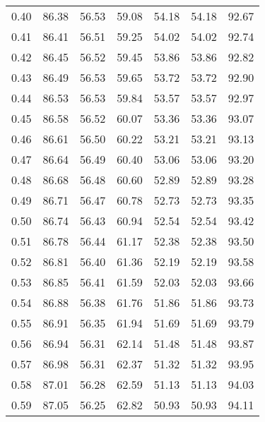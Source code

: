 \begin{tabular}{|c|c|c|c|c|c|c|}
      0.40 &     86.38 &     56.53 &      59.08 &   54.18 &      54.18 &         92.67 \\
      0.41 &     86.41 &     56.51 &      59.25 &   54.02 &      54.02 &         92.74 \\
      0.42 &     86.45 &     56.52 &      59.45 &   53.86 &      53.86 &         92.82 \\
      0.43 &     86.49 &     56.53 &      59.65 &   53.72 &      53.72 &         92.90 \\
      0.44 &     86.53 &     56.53 &      59.84 &   53.57 &      53.57 &         92.97 \\
      0.45 &     86.58 &     56.52 &      60.07 &   53.36 &      53.36 &         93.07 \\
      0.46 &     86.61 &     56.50 &      60.22 &   53.21 &      53.21 &         93.13 \\
      0.47 &     86.64 &     56.49 &      60.40 &   53.06 &      53.06 &         93.20 \\
      0.48 &     86.68 &     56.48 &      60.60 &   52.89 &      52.89 &         93.28 \\
      0.49 &     86.71 &     56.47 &      60.78 &   52.73 &      52.73 &         93.35 \\
      0.50 &     86.74 &     56.43 &      60.94 &   52.54 &      52.54 &         93.42 \\
      0.51 &     86.78 &     56.44 &      61.17 &   52.38 &      52.38 &         93.50 \\
      0.52 &     86.81 &     56.40 &      61.36 &   52.19 &      52.19 &         93.58 \\
      0.53 &     86.85 &     56.41 &      61.59 &   52.03 &      52.03 &         93.66 \\
      0.54 &     86.88 &     56.38 &      61.76 &   51.86 &      51.86 &         93.73 \\
      0.55 &     86.91 &     56.35 &      61.94 &   51.69 &      51.69 &         93.79 \\
      0.56 &     86.94 &     56.31 &      62.14 &   51.48 &      51.48 &         93.87 \\
      0.57 &     86.98 &     56.31 &      62.37 &   51.32 &      51.32 &         93.95 \\
      0.58 &     87.01 &     56.28 &      62.59 &   51.13 &      51.13 &         94.03 \\
      0.59 &     87.05 &     56.25 &      62.82 &   50.93 &      50.93 &         94.11 \\

\end{tabular}
